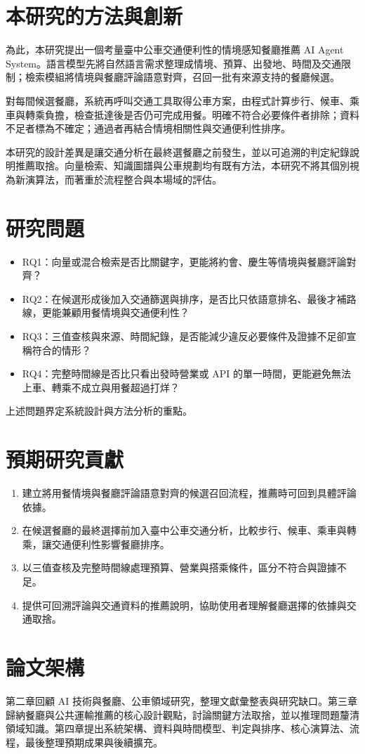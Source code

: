 \section{本研究的方法與創新}

為此，本研究提出一個考量臺中公車交通便利性的情境感知餐廳推薦 AI Agent System。語言模型先將自然語言需求整理成情境、預算、出發地、時間及交通限制；檢索模組將情境與餐廳評論語意對齊，召回一批有來源支持的餐廳候選。

對每間候選餐廳，系統再呼叫交通工具取得公車方案，由程式計算步行、候車、乘車與轉乘負擔，檢查抵達後是否仍可完成用餐。明確不符合必要條件者排除；資料不足者標為不確定；通過者再結合情境相關性與交通便利性排序。

本研究的設計差異是讓交通分析在最終選餐廳之前發生，並以可追溯的判定紀錄說明推薦取捨。向量檢索、知識圖譜與公車規劃均有既有方法，本研究不將其個別視為新演算法，而著重於流程整合與本場域的評估。

\section{研究問題}
\label{sec:research_questions}

\begin{itemize}
\item RQ1：向量或混合檢索是否比關鍵字，更能將約會、慶生等情境與餐廳評論對齊？
\item RQ2：在候選形成後加入交通篩選與排序，是否比只依語意排名、最後才補路線，更能兼顧用餐情境與交通便利性？
\item RQ3：三值查核與來源、時間紀錄，是否能減少違反必要條件及證據不足卻宣稱符合的情形？
\item RQ4：完整時間線是否比只看出發時營業或 API 的單一時間，更能避免無法上車、轉乘不成立與用餐超過打烊？
\end{itemize}

上述問題界定系統設計與方法分析的重點。

\section{預期研究貢獻}

\begin{enumerate}
\item 建立將用餐情境與餐廳評論語意對齊的候選召回流程，推薦時可回到具體評論依據。
\item 在候選餐廳的最終選擇前加入臺中公車交通分析，比較步行、候車、乘車與轉乘，讓交通便利性影響餐廳排序。
\item 以三值查核及完整時間線處理預算、營業與搭乘條件，區分不符合與證據不足。
\item 提供可回溯評論與交通資料的推薦說明，協助使用者理解餐廳選擇的依據與交通取捨。
\end{enumerate}

\section{論文架構}

第二章回顧 AI 技術與餐廳、公車領域研究，整理文獻彙整表與研究缺口。第三章歸納餐廳與公共運輸推薦的核心設計觀點，討論關鍵方法取捨，並以推理問題釐清領域知識。第四章提出系統架構、資料與時間模型、判定與排序、核心演算法、流程，最後整理預期成果與後續擴充。
